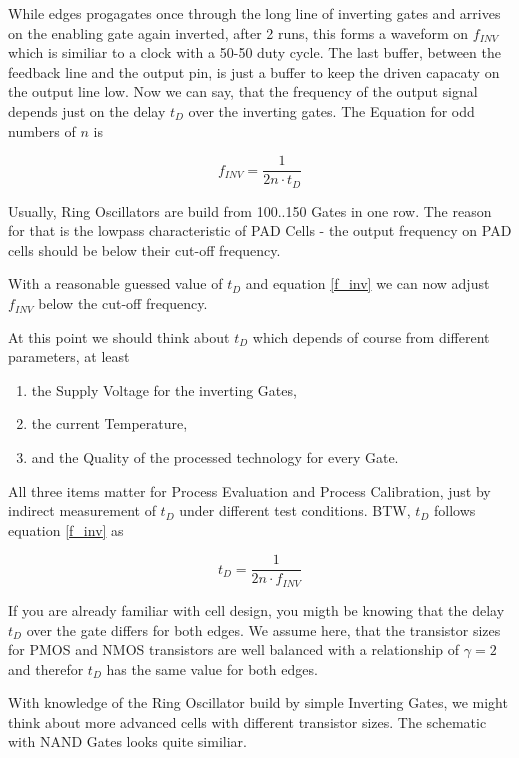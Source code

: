 While edges progagates once through the long line of inverting gates and arrives on the enabling gate again inverted, after 2 runs, this forms a waveform on $f_{INV}$ which is similiar to a clock with a 50-50 duty cycle. The last buffer, between the feedback line and the output pin, is just a buffer to keep the driven capacaty on the output line low.
Now we can say, that the frequency of the output signal depends just on the delay $t_D$ over the inverting gates. The Equation for odd numbers of $n$ is

\begin{equation}\label{f_inv}
    f_{INV} = \frac{1}{2n \cdot t_D}
\end{equation}

Usually, Ring Oscillators are build from 100..150 Gates in one row. The reason for that is the lowpass characteristic of PAD Cells - the output frequency on PAD cells should be below their cut-off frequency.

With a reasonable guessed value of $t_D$ and equation \ref{f_inv} we can now adjust $f_{INV}$ below the cut-off frequency.

At this point we should think about $t_D$ which depends of course from different parameters, at least

\begin{enumerate}
\item the Supply Voltage for the inverting Gates,
\item the current Temperature,
\item and the Quality of the processed technology for every Gate.
\end{enumerate}

All three items matter for Process Evaluation and Process Calibration, just by indirect measurement of $t_D$ under different test conditions. BTW, $t_D$ follows equation \ref{f_inv} as

\begin{equation}\label{t_D}
    t_D = \frac{1}{2n \cdot f_{INV}}
\end{equation}

If you are already familiar with cell design, you migth be knowing that the delay $t_D$ over the gate differs for both edges. We assume here, that the transistor sizes for PMOS and NMOS transistors are well balanced with a relationship of $\gamma = 2$ and therefor $t_D$ has the same value for both edges.

With knowledge of the Ring Oscillator build by simple Inverting Gates, we might think about more advanced cells with different transistor sizes. The schematic with NAND Gates looks quite similiar.

